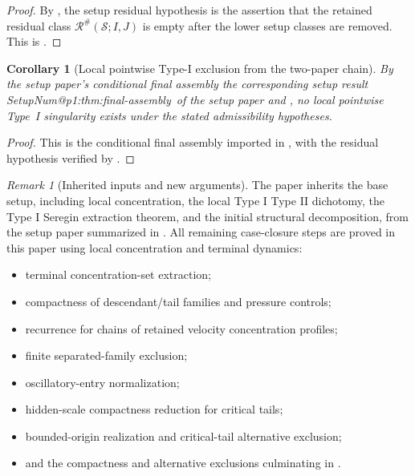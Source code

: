 \documentclass[11pt]{amsart}
\makeatletter
\numberwithin{equation}{section}
\theoremstyle{plain}
\newtheorem{corollary}[corollary]{Corollary}
\theoremstyle{definition}
\theoremstyle{remark}
\newtheorem{remark}[remark]{Remark}
\newcommand{\calS}{\mathcal S}
\newcommand{\calR}{\mathcal R}
\newcommand{\SetupLabel}[1]{%
   \@ifundefined{SetupNum@#1}%
      {\textup{the corresponding setup result}}%
      {\csname SetupNum@#1\endcsname\ of the setup paper}%
}
\makeatother
\begin{document}
\begin{proof}
By , the setup residual hypothesis is
the assertion that the retained residual class
\(\calR^\#(\calS;I,J)\) is empty after the lower setup classes are removed.
This is .
\end{proof}

\begin{corollary}[Local pointwise Type-I exclusion from the two-paper chain]
\label{cor:two-paper-local-typeI-exclusion}
By the setup paper's conditional final assembly
\SetupLabel{p1:thm:final-assembly} and
, no local pointwise Type~I
singularity exists under the stated admissibility hypotheses.
\end{corollary}

\begin{proof}
This is the conditional final assembly imported in
, with the residual hypothesis verified by
.
\end{proof}

\begin{remark}[Inherited inputs and new arguments]
\label{rem:imported-vs-proved}
The paper inherits the base setup, including local concentration, the local Type I
Type II dichotomy, the Type I Seregin extraction theorem, and the initial
structural decomposition, from the setup paper summarized in
.  All remaining case-closure steps are proved in this
paper using local concentration and terminal dynamics:
\begin{itemize}
\item terminal concentration-set extraction;
\item compactness of descendant/tail families and pressure controls;
\item recurrence for chains of retained velocity concentration profiles;
\item finite separated-family exclusion;
\item oscillatory-entry normalization;
\item hidden-scale compactness reduction for critical tails;
\item bounded-origin realization and critical-tail alternative exclusion;
\item and the compactness and alternative exclusions culminating in
 .
\end{itemize}
\end{remark}
\end{document}
